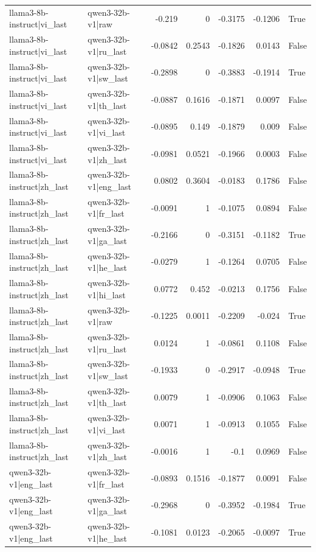 \begin{table}
\begin{tabular}{l l r r r r l}
llama3-8b-instruct|vi_last & qwen3-32b-v1|raw & -0.219 & 0 & -0.3175 & -0.1206 & True \\
llama3-8b-instruct|vi_last & qwen3-32b-v1|ru_last & -0.0842 & 0.2543 & -0.1826 & 0.0143 & False \\
llama3-8b-instruct|vi_last & qwen3-32b-v1|sw_last & -0.2898 & 0 & -0.3883 & -0.1914 & True \\
llama3-8b-instruct|vi_last & qwen3-32b-v1|th_last & -0.0887 & 0.1616 & -0.1871 & 0.0097 & False \\
llama3-8b-instruct|vi_last & qwen3-32b-v1|vi_last & -0.0895 & 0.149 & -0.1879 & 0.009 & False \\
llama3-8b-instruct|vi_last & qwen3-32b-v1|zh_last & -0.0981 & 0.0521 & -0.1966 & 0.0003 & False \\
llama3-8b-instruct|zh_last & qwen3-32b-v1|eng_last & 0.0802 & 0.3604 & -0.0183 & 0.1786 & False \\
llama3-8b-instruct|zh_last & qwen3-32b-v1|fr_last & -0.0091 & 1 & -0.1075 & 0.0894 & False \\
llama3-8b-instruct|zh_last & qwen3-32b-v1|ga_last & -0.2166 & 0 & -0.3151 & -0.1182 & True \\
llama3-8b-instruct|zh_last & qwen3-32b-v1|he_last & -0.0279 & 1 & -0.1264 & 0.0705 & False \\
llama3-8b-instruct|zh_last & qwen3-32b-v1|hi_last & 0.0772 & 0.452 & -0.0213 & 0.1756 & False \\
llama3-8b-instruct|zh_last & qwen3-32b-v1|raw & -0.1225 & 0.0011 & -0.2209 & -0.024 & True \\
llama3-8b-instruct|zh_last & qwen3-32b-v1|ru_last & 0.0124 & 1 & -0.0861 & 0.1108 & False \\
llama3-8b-instruct|zh_last & qwen3-32b-v1|sw_last & -0.1933 & 0 & -0.2917 & -0.0948 & True \\
llama3-8b-instruct|zh_last & qwen3-32b-v1|th_last & 0.0079 & 1 & -0.0906 & 0.1063 & False \\
llama3-8b-instruct|zh_last & qwen3-32b-v1|vi_last & 0.0071 & 1 & -0.0913 & 0.1055 & False \\
llama3-8b-instruct|zh_last & qwen3-32b-v1|zh_last & -0.0016 & 1 & -0.1 & 0.0969 & False \\
qwen3-32b-v1|eng_last & qwen3-32b-v1|fr_last & -0.0893 & 0.1516 & -0.1877 & 0.0091 & False \\
qwen3-32b-v1|eng_last & qwen3-32b-v1|ga_last & -0.2968 & 0 & -0.3952 & -0.1984 & True \\
qwen3-32b-v1|eng_last & qwen3-32b-v1|he_last & -0.1081 & 0.0123 & -0.2065 & -0.0097 & True \\

\end{tabular}
\end{table}
